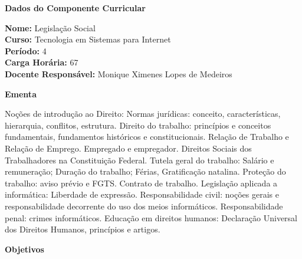 

\begin{snugshade}\begin{center}\textbf{
    Dados do Componente Curricular
}\end{center}\end{snugshade}

\noindent \textbf{Nome:}                Legislação Social
\\        \textbf{Curso:}               Tecnologia em Sistemas para Internet
\\        \textbf{Período:}             \unit{4}{\degree}
\\        \textbf{Carga Horária:}       \unit{67}{\hour}
\\        \textbf{Docente Responsável:} Monique Ximenes Lopes de Medeiros


\begin{snugshade}\begin{center}\textbf{
    Ementa
\vphantom{q}}\end{center}\end{snugshade}

\noindent
Noções de introdução ao Direito: Normas jurídicas: conceito, características, hierarquia, conflitos, estrutura. Direito do trabalho: princípios e conceitos fundamentais, fundamentos históricos e constitucionais. Relação de Trabalho e Relação de Emprego. Empregado e empregador. Direitos Sociais dos Trabalhadores na Constituição Federal. Tutela geral do trabalho: Salário e remuneração; Duração do trabalho; Férias, Gratificação natalina. Proteção do trabalho: aviso prévio e FGTS. Contrato de trabalho. Legislação aplicada a informática: Liberdade de expressão. Responsabilidade civil: noções gerais e responsabilidade decorrente do uso dos meios informáticos. Responsabilidade penal: crimes informáticos. Educação em direitos humanos: Declaração Universal dos Direitos Humanos, princípios e artigos. 


\begin{snugshade}\begin{center}\textbf{
    Objetivos
}\end{center}\end{snugshade}

